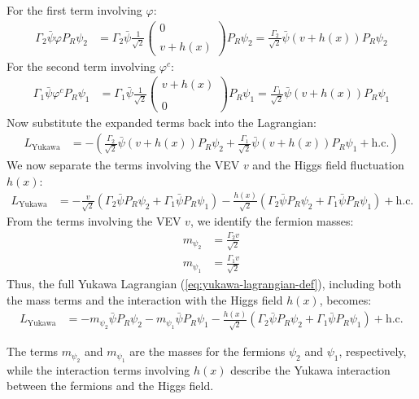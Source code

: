 For the first term involving $\varphi$:
\begin{align}
    \Gamma_2 \bar{\psi} \varphi P_R \psi_2 &= \Gamma_2 \bar{\psi} \frac{1}{\sqrt{2}} \begin{pmatrix} 0 \\\\ v + h(x) \end{pmatrix} P_R \psi_2 = \frac{\Gamma_2}{\sqrt{2}} \bar{\psi} (v + h(x)) P_R \psi_2
\end{align}
For the second term involving $\varphi^c$:
\begin{align}
    \Gamma_1 \bar{\psi} \varphi^c P_R \psi_1 &= \Gamma_1 \bar{\psi} \frac{1}{\sqrt{2}} \begin{pmatrix} v + h(x) \\\\ 0 \end{pmatrix} P_R \psi_1 = \frac{\Gamma_1}{\sqrt{2}} \bar{\psi} (v + h(x)) P_R \psi_1
\end{align}
Now substitute the expanded terms back into the Lagrangian:
\begin{align}
    L_{\text{Yukawa}} &= - \left( \frac{\Gamma_2}{\sqrt{2}} \bar{\psi} (v + h(x)) P_R \psi_2 + \frac{\Gamma_1}{\sqrt{2}} \bar{\psi} (v + h(x)) P_R \psi_1 + \text{h.c.} \right)
\end{align}
We now separate the terms involving the VEV $v$ and the Higgs field fluctuation $h(x)$:
\begin{align}
    L_{\text{Yukawa}} &= - \frac{v}{\sqrt{2}} \left( \Gamma_2 \bar{\psi} P_R \psi_2 + \Gamma_1 \bar{\psi} P_R \psi_1 \right) - \frac{h(x)}{\sqrt{2}} \left( \Gamma_2 \bar{\psi} P_R \psi_2 + \Gamma_1 \bar{\psi} P_R \psi_1 \right) + \text{h.c.}
\end{align}
From the terms involving the VEV $v$, we identify the fermion masses:
\begin{align}
    m_{\psi_2} &= \frac{\Gamma_2 v}{\sqrt{2}} \\
    m_{\psi_1} &= \frac{\Gamma_1 v}{\sqrt{2}}
\end{align}
Thus, the full Yukawa Lagrangian (\ref{eq:yukawa-lagrangian-def}), including both the mass terms and the interaction with the Higgs field $h(x)$, becomes:
\begin{align}
    L_{\text{Yukawa}} &= - m_{\psi_2} \bar{\psi} P_R \psi_2 - m_{\psi_1} \bar{\psi} P_R \psi_1 - \frac{h(x)}{\sqrt{2}} \left( \Gamma_2 \bar{\psi} P_R \psi_2 + \Gamma_1 \bar{\psi} P_R \psi_1 \right) + \text{h.c.}
\end{align}

The terms $m_{\psi_2}$ and $m_{\psi_1}$ are the masses for the fermions $\psi_2$ and $\psi_1$, respectively, while the interaction terms involving $h(x)$ describe the Yukawa interaction between the fermions and the Higgs field.
\bigskip\bigskip\hline\hline\bigskip